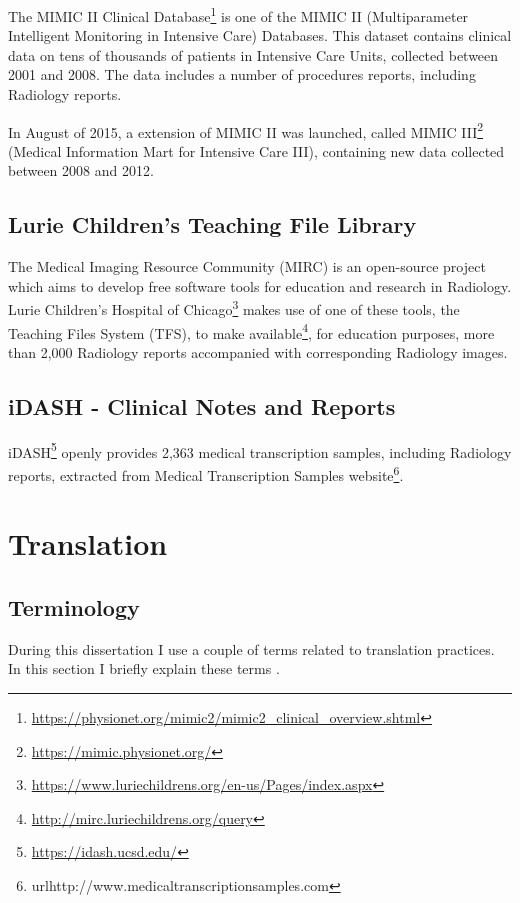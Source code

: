 The MIMIC II Clinical Database\footnote{\url{https://physionet.org/mimic2/mimic2\_clinical\_overview.shtml}} is one of the MIMIC II (Multiparameter Intelligent Monitoring in Intensive Care) Databases. This dataset contains clinical data on tens of thousands of patients in Intensive Care Units, collected between 2001 and 2008. The data includes a number of procedures reports, including Radiology reports. 

In August of 2015, a extension of MIMIC II was launched, called MIMIC III\footnote{\url{https://mimic.physionet.org/}} (Medical Information Mart for Intensive Care III)\citep{Johnson2016}, containing new data collected between 2008 and 2012.

\subsection{Lurie Children's Teaching File Library}

The Medical Imaging Resource Community (MIRC) is an open-source project which aims to develop free software tools for education and research in Radiology. Lurie Children's Hospital of Chicago\footnote{\url{https://www.luriechildrens.org/en-us/Pages/index.aspx}} makes use of one of these tools, the Teaching Files System (TFS), to make available\footnote{\url{http://mirc.luriechildrens.org/query}}, for education purposes, more than 2,000 Radiology reports accompanied with corresponding Radiology images. 
 
\subsection{iDASH - Clinical Notes and Reports}

iDASH\footnote{\url{https://idash.ucsd.edu/}} openly provides 2,363 medical transcription samples, including Radiology reports, extracted from Medical Transcription Samples website\footnote{url{http://www.medicaltranscriptionsamples.com}}. 

\section{Translation}

\subsection{Terminology}

During this dissertation I use a couple of terms related to translation practices. In this section I briefly explain these terms \citep{Koehn2010}. 

